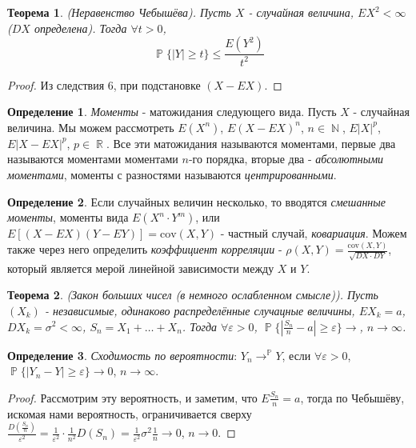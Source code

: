 \documentclass[a4paper,100pt]{article}
\theoremstyle{indented}
\newtheorem{theorem}{Теорема}
\theoremstyle{definition}
\newtheorem{defn}{Определение}
\theoremstyle{remark}
\DeclareMathOperator{\RR}{\mathbb{R}}
\DeclareMathOperator{\NN}{\mathbb{N}}
\DeclareMathOperator{\PP}{\mathbb{P}}
\begin{document}
\begin{theorem}
    (Неравенство Чебышёва). Пусть $X$ - случайная величина, $EX^2<\infty$ ($DX$ определена). Тогда $\forall t >0$, 
    \[
        \PP\{|Y|\geq t\}\leq \frac{E(Y^2)}{t^2}
    \]
\end{theorem}

\begin{proof}
    Из следствия 6, при подстановке $(X-EX)$. 
\end{proof}

\begin{defn}
    \textit{Моменты} - матожидания следующего вида. Пусть $X$ - случайная величина. Мы можем рассмотреть $E(X^n)$, $E(X-EX)^n$, $n\in \NN$, $E|X|^p$, $E|X-EX|^p$, $p\in \RR$. Все эти матожидания называются моментами, первые два называются моментами моментами $n$-го порядка, вторые два - \textit{абсолютными моментами}, моменты с разностями называются \textit{центрированными}.  
\end{defn}

\begin{defn}
    Если случайных величин несколько, то вводятся \textit{смешанные моменты}, моменты вида $E(X^n\cdot Y^m)$, или $E[(X-EX)(Y-EY)]=\text{cov}(X, Y)$ - частный случай, \textit{ковариация}. Можем также через него определить \textit{коэффициент корреляции} - $\rho(X, Y)=\frac{\text{cov}(X, Y)}{\sqrt{DX\cdot DY}}$, который является мерой линейной зависимости между $X$ и $Y$. 
\end{defn}

\begin{theorem}
    (Закон больших чисел (в немного ослабленном смысле)). Пусть $(X_k)$ - независимые, одинаково распределённые случацные величины, $EX_k=a$, $DX_k=\sigma^2<\infty$, $S_n= X_1+\ldots+X_n$. Тогда $\forall \varepsilon>0$, $\PP\{|\frac{S_n}{n}-a|\geq \varepsilon\}\rightarrow$, $n\rightarrow \infty$.  
\end{theorem}

\begin{defn}
    \textit{Сходимость по вероятности}: $Y_n \rightarrow^{\PP} Y$, если $\forall \varepsilon>0$, $\PP\{|Y_n-Y|\geq \varepsilon\}\rightarrow 0$, $n\rightarrow \infty$. 
\end{defn}

\begin{proof}
    Рассмотрим эту вероятность, и заметим, что $E\frac{S_n}{n}=a$, тогда по Чебышёву, искомая нами вероятность, ограничивается сверху $\frac{D(\frac{S_n}{n})}{\varepsilon^2} = \frac{1}{\varepsilon^2}\cdot \frac{1}{n^2}D(S_n)= \frac{1}{\varepsilon^2}\sigma^2\frac{1}{n}\rightarrow 0 $, $n\rightarrow 0$. 
\end{proof}
\end{document}
